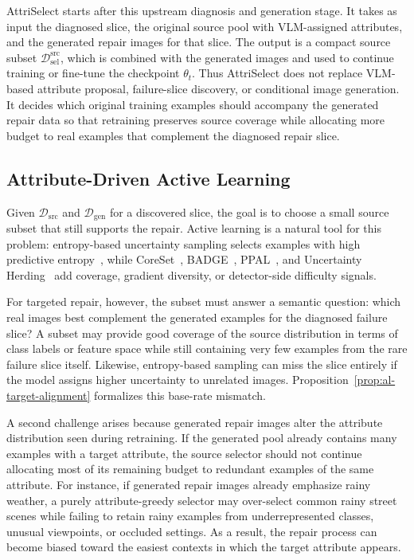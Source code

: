\documentclass{article}
\newcommand{\model}{AttriSelect\xspace}
\newcommand{\dataset}{\mathcal{D}}
\begin{document}
\model starts after this upstream diagnosis and generation stage. It takes as input the diagnosed slice, the original source pool with VLM-assigned attributes, and the generated repair images for that slice. The output is a compact source subset $\dataset_{\mathrm{sel}}^{\mathrm{src}}$, which is combined with the generated images and used to continue training or fine-tune the checkpoint $\theta_t$. Thus \model does not replace VLM-based attribute proposal, failure-slice discovery, or conditional image generation. It decides which original training examples should accompany the generated repair data so that retraining preserves source coverage while allocating more budget to real examples that complement the diagnosed repair slice.

\subsection{Attribute-Driven Active Learning}

Given $\dataset_{\mathrm{src}}$ and $\dataset_{\mathrm{gen}}$ for a discovered slice, the goal is to choose a small source subset that still supports the repair. Active learning is a natural tool for this problem: entropy-based uncertainty sampling selects examples with high predictive entropy~\citep{settles2009active}, while CoreSet~\citep{sener2018active}, BADGE~\citep{ash2020deep}, PPAL~\citep{yang2024ppal}, and Uncertainty Herding~\citep{bae2025uncertainty} add coverage, gradient diversity, or detector-side difficulty signals.

For targeted repair, however, the subset must answer a semantic question: which real images best complement the generated examples for the diagnosed failure slice? A subset may provide good coverage of the source distribution in terms of class labels or feature space while still containing very few examples from the rare failure slice itself. Likewise, entropy-based sampling can miss the slice entirely if the model assigns higher uncertainty to unrelated images. Proposition~\ref{prop:al-target-alignment} formalizes this base-rate mismatch.

A second challenge arises because generated repair images alter the attribute distribution seen during retraining. If the generated pool already contains many examples with a target attribute, the source selector should not continue allocating most of its remaining budget to redundant examples of the same attribute. For instance, if generated repair images already emphasize rainy weather, a purely attribute-greedy selector may over-select common rainy street scenes while failing to retain rainy examples from underrepresented classes, unusual viewpoints, or occluded settings. As a result, the repair process can become biased toward the easiest contexts in which the target attribute appears.
\end{document}
